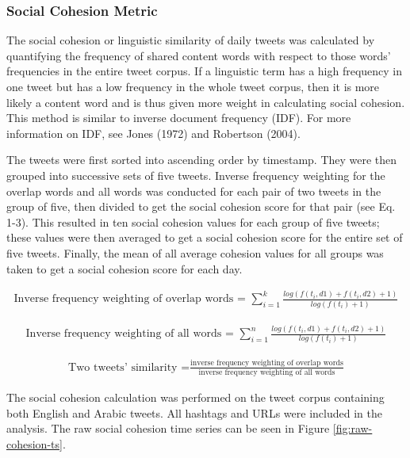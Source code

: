 \documentclass[
  english,
  man]{apa6}
\begin{document}
\hypertarget{social-cohesion-metric}{%
\subsubsection{Social Cohesion Metric}\label{social-cohesion-metric}}

The social cohesion or linguistic similarity of daily tweets was calculated by
quantifying the frequency of shared content words with respect to those words'
frequencies in the entire tweet corpus. If a linguistic term has a high
frequency in one tweet but has a low frequency in the whole tweet corpus, then
it is more likely a content word and is thus given more weight in calculating
social cohesion. This method is similar to inverse document frequency (IDF). For
more information on IDF, see Jones (1972) and
Robertson (2004).

The tweets were first sorted into ascending order by timestamp. They were then
grouped into successive sets of five tweets. Inverse frequency weighting for the
overlap words and all words was conducted for each pair of two tweets in the
group of five, then divided to get the social cohesion score for that pair (see
Eq. 1-3). This resulted in ten social cohesion values for each group of five
tweets; these values were then averaged to get a social cohesion score for the
entire set of five tweets. Finally, the mean of all average cohesion values for
all groups was taken to get a social cohesion score for each day.

\begin{align}
\text{Inverse frequency weighting of overlap words = }\sum_{i=1}^k
\frac{log(f(t_i, d1) + f(t_i, d2) + 1)}{log(f(t_i) + 1)}
\end{align}

\begin{align}
\text{Inverse frequency weighting of all words = }\sum_{i=1}^n \frac{log(f(t_i,
d1) + f(t_i, d2) + 1)}{log(f(t_i) + 1)}
\end{align}

\begin{align}
\text{Two tweets' similarity =}\frac{\text{inverse frequency weighting of overlap
words}}{\text{inverse frequency weighting of all words}}
\end{align}

\noindent The social cohesion calculation was performed on the tweet corpus
containing both English and Arabic tweets. All hashtags and URLs were included
in the analysis. The raw social cohesion time series can be seen in Figure
\ref{fig:raw-cohesion-ts}.
\end{document}
